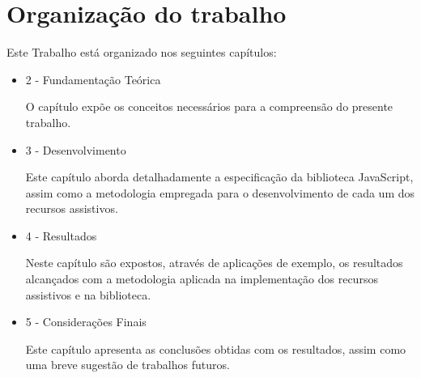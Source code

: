 
\section{Organização do trabalho}

Este Trabalho está organizado nos seguintes capítulos:

\begin{itemize}
    \item 2 - Fundamentação Teórica
    \par O capítulo expõe os conceitos necessários para a compreensão do presente trabalho.
    \item 3 - Desenvolvimento
    \par Este capítulo aborda detalhadamente a especificação da biblioteca JavaScript, assim como a metodologia empregada para o desenvolvimento de cada um dos recursos assistivos.
    \item 4 - Resultados
    \par Neste capítulo são expostos, através de aplicações de exemplo, os resultados alcançados com a metodologia aplicada na implementação dos recursos assistivos e na biblioteca.
    \item 5 - Considerações Finais
    \par Este capítulo apresenta as conclusões obtidas com os resultados, assim como uma breve sugestão de trabalhos futuros.
\end{itemize}

